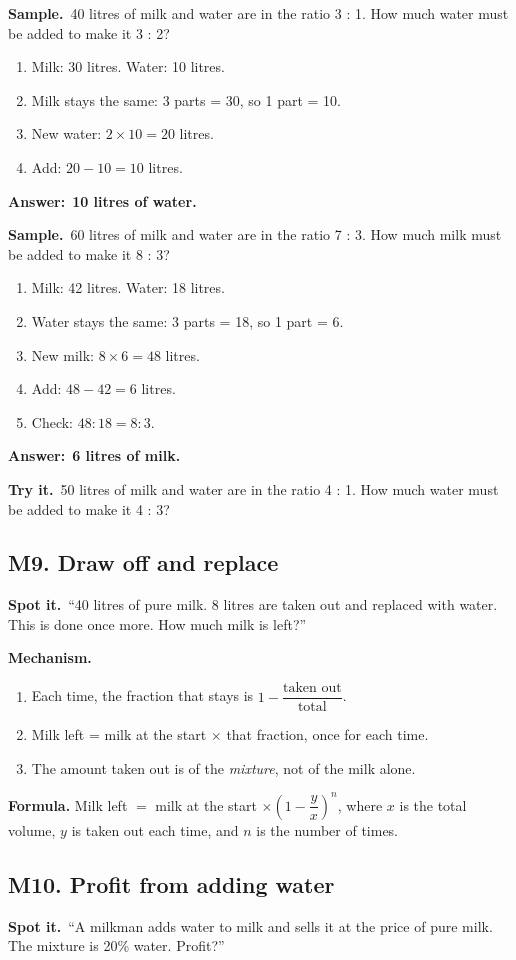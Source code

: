 \documentclass[11pt,a4paper]{article}
\let\oldsubsection\subsection
\renewcommand{\subsection}{\needspace{9\baselineskip}\oldsubsection}
\newcommand{\spot}{\textbf{\color{ember}Spot it.}\ }
\newcommand{\mech}{\textbf{\color{ember}Mechanism.}\ }
\newif\ifkeepsamp
\newcommand{\ans}[1]{\par\nopagebreak\noindent\textbf{\color{ember}Answer:}\ \textbf{#1}\par}
\newcommand{\samp}{\ifkeepsamp\needspace{4\baselineskip}\fi\textbf{\color{ember}Sample.}\ }
\newcommand{\tryit}[1]{\textbf{\color{ember}Try it.}\ #1}
\begin{document}
\samp 40 litres of milk and water are in the ratio 3 : 1. How much water must be added to make it 3 : 2?
\begin{enumerate}
\item Milk: 30 litres. Water: 10 litres.
\item Milk stays the same: 3 parts = 30, so 1 part = 10.
\item New water: $2 \times 10 = 20$ litres.
\item Add: $20 - 10 = 10$ litres.
\end{enumerate}
\ans{10 litres of water.}

\samp 60 litres of milk and water are in the ratio 7 : 3. How much milk must be added to make it 8 : 3?
\begin{enumerate}
\item Milk: 42 litres. Water: 18 litres.
\item Water stays the same: 3 parts = 18, so 1 part = 6.
\item New milk: $8 \times 6 = 48$ litres.
\item Add: $48 - 42 = 6$ litres.
\item Check: $48 : 18 = 8 : 3$.
\end{enumerate}
\ans{6 litres of milk.}

\tryit 50 litres of milk and water are in the ratio 4 : 1. How much water must be added to make it 4 : 3?

\subsection{M9. Draw off and replace}
\spot ``40 litres of pure milk. 8 litres are taken out and replaced with water. This is done once more. How much milk is left?''

\mech
\begin{enumerate}
\item Each time, the fraction that stays is $1 - \dfrac{\text{taken out}}{\text{total}}$.
\item Milk left = milk at the start $\times$ that fraction, once for each time.
\item The amount taken out is of the \emph{mixture}, not of the milk alone.
\end{enumerate}
\textbf{Formula.} Milk left $=$ milk at the start $\times\left(1-\dfrac{y}{x}\right)^{n}$, where $x$ is the total volume, $y$ is taken out each time, and $n$ is the number of times.

\subsection{M10. Profit from adding water}
\spot ``A milkman adds water to milk and sells it at the price of pure milk. The mixture is 20\% water. Profit?''
\end{document}
